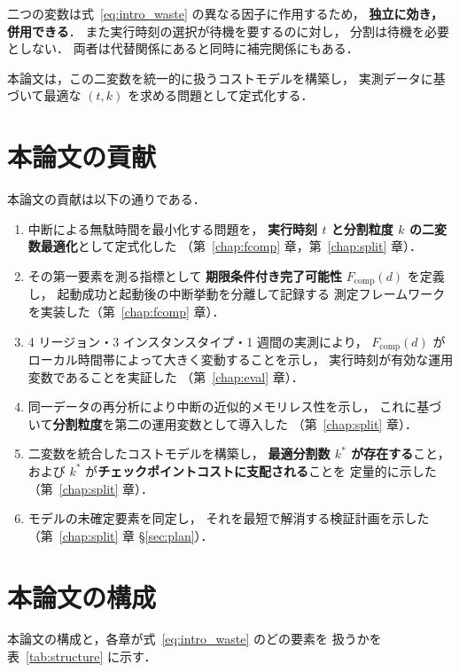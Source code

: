 \documentclass[11pt,a4paper]{ltjsreport}
\newcommand{\Fcomp}{F_{\mathrm{comp}}}
\begin{document}
二つの変数は式~\eqref{eq:intro_waste} の異なる因子に作用するため，
\textbf{独立に効き，併用できる}．
また実行時刻の選択が待機を要するのに対し，
分割は待機を必要としない．
両者は代替関係にあると同時に補完関係にもある．

本論文は，この二変数を統一的に扱うコストモデルを構築し，
実測データに基づいて最適な $(t, k)$ を求める問題として定式化する．

\section{本論文の貢献}

本論文の貢献は以下の通りである．

\begin{enumerate}
  \item 中断による無駄時間を最小化する問題を，
        \textbf{実行時刻 $t$ と分割粒度 $k$ の二変数最適化}として定式化した
        （第~\ref{chap:fcomp} 章，第~\ref{chap:split} 章）．
  \item その第一要素を測る指標として
        \textbf{期限条件付き完了可能性} $\Fcomp(d)$ を定義し，
        起動成功と起動後の中断挙動を分離して記録する
        測定フレームワークを実装した（第~\ref{chap:fcomp} 章）．
  \item 4 リージョン・3 インスタンスタイプ・1 週間の実測により，
        $\Fcomp(d)$ がローカル時間帯によって大きく変動することを示し，
        実行時刻が有効な運用変数であることを実証した
        （第~\ref{chap:eval} 章）．
  \item 同一データの再分析により中断の近似的メモリレス性を示し，
        これに基づいて\textbf{分割粒度}を第二の運用変数として導入した
        （第~\ref{chap:split} 章）．
  \item 二変数を統合したコストモデルを構築し，
        \textbf{最適分割数 $k^{*}$ が存在する}こと，
        および $k^{*}$ が\textbf{チェックポイントコストに支配される}ことを
        定量的に示した（第~\ref{chap:split} 章）．
  \item モデルの未確定要素を同定し，
        それを最短で解消する検証計画を示した
        （第~\ref{chap:split} 章 \S\ref{sec:plan}）．
\end{enumerate}

\section{本論文の構成}

本論文の構成と，各章が式~\eqref{eq:intro_waste} のどの要素を
扱うかを表~\ref{tab:structure} に示す．
\end{document}
